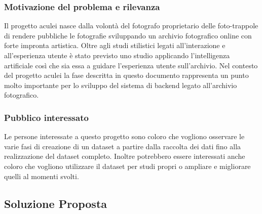 \documentclass[12pt,a4paper,twoside]{article}
\begin{document}
\subsubsection{Motivazione del problema e rilevanza}
Il progetto aculei nasce dalla volontà del fotografo proprietario delle foto-trappole di rendere pubbliche le fotografie sviluppando un archivio fotografico online con forte impronta artistica. Oltre agli studi stilistici legati all'interazione e all'esperienza utente è stato previsto uno studio applicando l'intelligenza artificiale così che sia essa a guidare l'esperienza utente sull'archivio. Nel contesto del progetto aculei la fase descritta in questo documento rappresenta un punto molto importante per lo sviluppo del sistema di backend legato all'archivio fotografico.

\subsubsection{Pubblico interessato}
Le persone interessate a questo progetto sono coloro che vogliono osservare le varie fasi di creazione di un dataset a partire dalla raccolta dei dati fino alla realizzazione del dataset completo. Inoltre potrebbero essere interessati anche coloro che vogliono utilizzare il dataset per studi propri o ampliare e migliorare quelli al momenti svolti.

\subsection{Soluzione Proposta}
\end{document}
